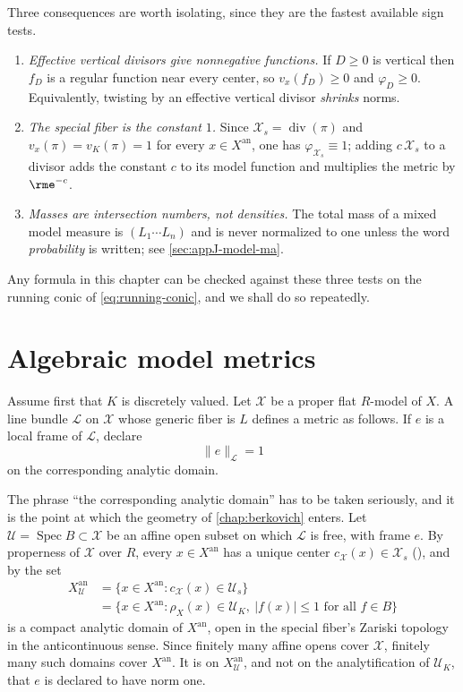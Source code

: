 \noindent Three consequences are worth isolating, since they are the
fastest available sign tests.
\begin{enumerate}
\item \emph{Effective vertical divisors give nonnegative functions.} If
$D\ge0$ is vertical then $f_D$ is a regular function near every center,
so $v_x(f_D)\ge0$ and $\varphi_D\ge0$. Equivalently, twisting by an
effective vertical divisor \emph{shrinks} norms.
\item \emph{The special fiber is the constant $1$.} Since
$\mathcal X_s=\operatorname{div}(\pi)$ and $v_x(\pi)=v_K(\pi)=1$ for
every $x\in X^{\mathrm{an}}$, one has $\varphi_{\mathcal X_s}\equiv1$;
adding $c\,\mathcal X_s$ to a divisor adds the constant $c$ to its model
function and multiplies the metric by $\rme^{-c}$.
\item \emph{Masses are intersection numbers, not densities.} The total mass
of a mixed model measure is $(L_1\cdots L_n)$ and is never normalized to
one unless the word \emph{probability} is written; see
\cref{sec:appJ-model-ma}.
\end{enumerate}
Any formula in this chapter can be checked against these three tests on the
running conic of \eqref{eq:running-conic}, and we shall do so repeatedly.

\section{Algebraic model metrics}
\label{sec:metrics-model}

Assume first that $K$ is discretely valued. Let $\mathcal X$ be a proper
flat $R$-model of $X$. A line bundle $\mathcal L$ on $\mathcal X$
whose generic fiber is $L$ defines a metric as follows. If $e$ is a local
frame of $\mathcal L$, declare
\[
                              \|e\|_{\mathcal L}=1
\]
on the corresponding analytic domain.

The phrase ``the corresponding analytic domain'' has to be taken seriously,
and it is the point at which the geometry of \cref{chap:berkovich} enters.
Let $\mathcal U=\operatorname{Spec}B\subset\mathcal X$ be an affine open
subset on which $\mathcal L$ is free, with frame $e$. By properness of
$\mathcal X$ over $R$, every $x\in X^{\mathrm{an}}$ has a unique center
$c_{\mathcal X}(x)\in\mathcal X_s$ (),
and by  the set
\[
\begin{split}
 X^{\mathrm{an}}_{\mathcal U}
 &=\{x\in X^{\mathrm{an}}:c_{\mathcal X}(x)\in\mathcal U_s\}\\
 &=\{x\in X^{\mathrm{an}}:\rho_X(x)\in\mathcal U_K,\
   |f(x)|\le1\text{ for all }f\in B\}
\end{split}
\]
is a compact analytic domain of $X^{\mathrm{an}}$, open in the special
fiber's Zariski topology in the anticontinuous sense. Since finitely many
affine opens cover $\mathcal X$, finitely many such domains cover
$X^{\mathrm{an}}$. It is on $X^{\mathrm{an}}_{\mathcal U}$, and not on
the analytification of $\mathcal U_K$, that $e$ is declared to have norm
one.

